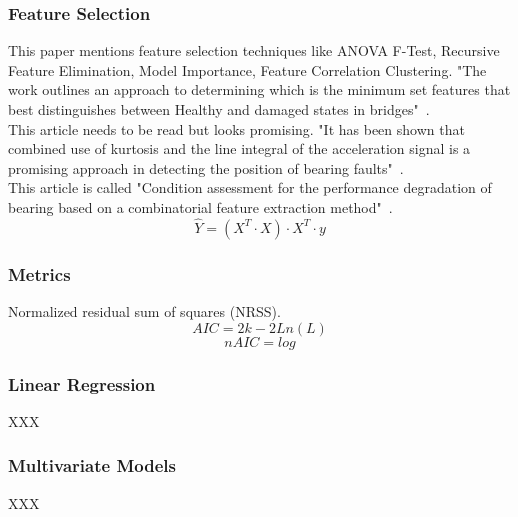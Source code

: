 \documentclass{article}
\begin{document}
\subsubsection{Feature Selection}
This paper mentions feature selection techniques like ANOVA F-Test, Recursive Feature Elimination, Model Importance, Feature Correlation Clustering. "The work outlines an approach to determining which is the minimum set features that best distinguishes between Healthy and damaged states in bridges"~\cite{buckley2023feature}.\\
This article needs to be read but looks promising. "It has been shown that combined use of kurtosis and the line integral of the acceleration signal is a promising approach in detecting the position of bearing faults"~\cite{kateris2014machine}.\\
This article is called "Condition assessment for the performance degradation of bearing based on a combinatorial feature extraction method"~\cite{hong2014condition}.
$$ \hat{Y} = (X^T \cdot X) \cdot X^T \cdot y $$
\subsubsection{Metrics}
Normalized residual sum of squares (NRSS).
$$ AIC = 2k - 2Ln(L) $$  
$$ nAIC = log $$
\subsubsection{Linear Regression}
XXX
\subsubsection{Multivariate Models}
XXX
\end{document}
